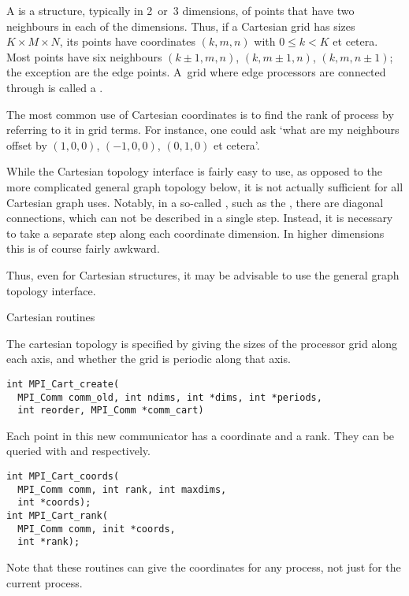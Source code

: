 A  is a structure, typically in 2~or~3 dimensions,
of points that have two neighbours in each of the dimensions.
Thus, if a Cartesian grid has sizes $K\times M\times N$, its
points have coordinates $(k,m,n)$ with $0\leq k<K$ et cetera.
Most points have six neighbours $(k\pm1,m,n)$, $(k,m\pm1,n)$, $(k,m,n\pm1)$;
the exception are the edge points. A~grid where edge processors
are connected through  is called
a .

The most common use of Cartesian coordinates
is to find the rank of process by referring to it in grid terms.
For instance, one could ask `what are my neighbours offset by $(1,0,0)$, 
$(-1,0,0)$, $(0,1,0)$ et cetera'.

While the Cartesian topology interface is fairly easy to use, as
opposed to the more complicated general graph topology below, it is
not actually sufficient for all Cartesian graph uses. Notably, in
a so-called , such as the
, there are diagonal connections,
which can not be described in a single step. Instead, it is necessary
to take a separate step along each coordinate dimension. In higher
dimensions this is of course fairly awkward.

Thus, even for Cartesian structures, it may be advisable to use the
general graph topology interface.

 {Cartesian routines}

The cartesian topology is specified by giving
 the sizes of the processor grid along
each axis, and whether the grid is periodic along that axis.

\begin{lstlisting}
int MPI_Cart_create(
  MPI_Comm comm_old, int ndims, int *dims, int *periods, 
  int reorder, MPI_Comm *comm_cart)
\end{lstlisting}

Each point in this new communicator has a coordinate and a rank.  They
can be queried with  and
 respectively.

\begin{lstlisting}
int MPI_Cart_coords(
  MPI_Comm comm, int rank, int maxdims,
  int *coords);
int MPI_Cart_rank(
  MPI_Comm comm, init *coords, 
  int *rank);
\end{lstlisting}

Note that these routines can give the coordinates for any process,
not just for the current process.
%

